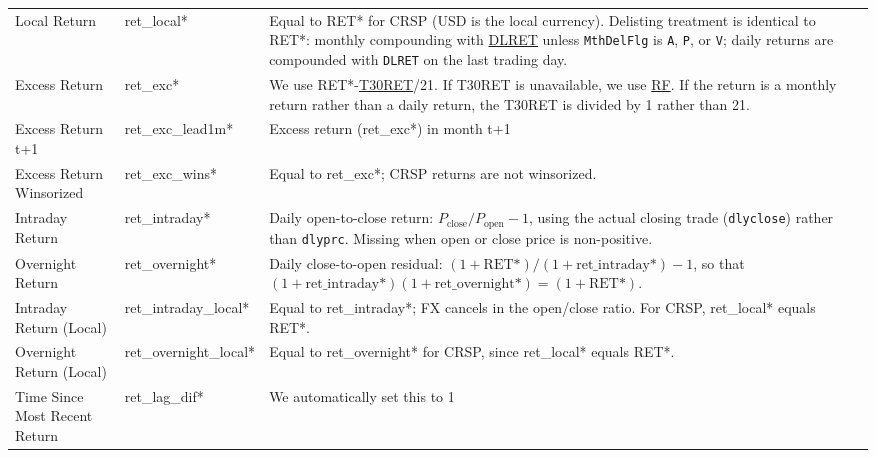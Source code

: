 \documentclass[12pt,title,fleqn]{article}
\begin{document}
{\begin{longtable}{@{\extracolsep{\fill}}|m{5cm}|l|m{8cm}|@{}}
    Local Return & ret\_local\mbox{*} & Equal to RET\mbox{*} for CRSP (USD is the local currency). Delisting treatment is identical to RET\mbox{*}: monthly compounding with \href{https://wrds-www.wharton.upenn.edu/data-dictionary/crsp_m_stock/dsedelist/dlret/}{DLRET} unless \texttt{MthDelFlg} is \texttt{A}, \texttt{P}, or \texttt{V}; daily returns are compounded with \texttt{DLRET} on the last trading day.\\
     
    Excess Return & ret\_exc\mbox{*} & We use RET\mbox{*}-\href{https://wrds-www.wharton.upenn.edu/data-dictionary/crsp_a_indexes/indmthseriesdata_ind/#row-mthtotret}{T30RET}/21. If T30RET is unavailable, we use 
    \href{https://wrds-www.wharton.upenn.edu/data-dictionary/ff_all/factors_monthly/#row-rf}{RF}. If the return is a monthly return rather than a daily return, the T30RET is divided by 1 rather than 21. \\
    
    Excess Return t+1 & ret\_exc\_lead1m\mbox{*} &  Excess return (ret\_exc\mbox{*}) in month t+1 \\

    Excess Return Winsorized & ret\_exc\_wins\mbox{*} & Equal to ret\_exc\mbox{*}; CRSP returns are not winsorized. \\

    Intraday Return & ret\_intraday\mbox{*} & Daily open-to-close return: $P_{\mathrm{close}}/P_{\mathrm{open}}-1$, using the actual closing trade (\texttt{dlyclose}) rather than \texttt{dlyprc}. Missing when open or close price is non-positive. \\

    Overnight Return & ret\_overnight\mbox{*} & Daily close-to-open residual: $(1+\mathrm{RET}\mbox{*})/(1+\mathrm{ret\_intraday}\mbox{*})-1$, so that $(1+\mathrm{ret\_intraday}\mbox{*})(1+\mathrm{ret\_overnight}\mbox{*})=(1+\mathrm{RET}\mbox{*})$. \\

    Intraday Return (Local) & ret\_intraday\_local\mbox{*} & Equal to ret\_intraday\mbox{*}; FX cancels in the open/close ratio. For CRSP, ret\_local\mbox{*} equals RET\mbox{*}. \\

    Overnight Return (Local) & ret\_overnight\_local\mbox{*} & Equal to ret\_overnight\mbox{*} for CRSP, since ret\_local\mbox{*} equals RET\mbox{*}. \\

    Time Since Most Recent Return & ret\_lag\_dif\mbox{*} & We automatically set this to 1 \\
    

\end{longtable}}
\end{document}
